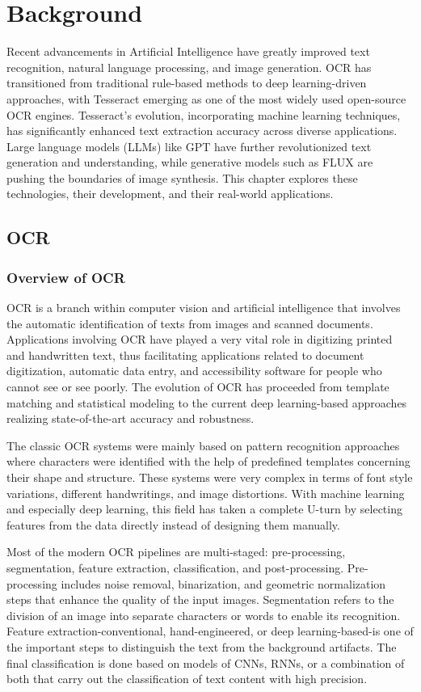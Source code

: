 \chapter{Background}

Recent advancements in Artificial Intelligence have greatly improved text recognition, natural language processing, and image generation. OCR has transitioned from traditional rule-based methods to deep learning-driven approaches, with Tesseract emerging as one of the most widely used open-source OCR engines. Tesseract’s evolution, incorporating machine learning techniques, has significantly enhanced text extraction accuracy across diverse applications. Large language models (LLMs) like GPT have further revolutionized text generation and understanding, while generative models such as FLUX are pushing the boundaries of image synthesis. This chapter explores these technologies, their development, and their real-world applications.


\section{OCR}
\subsection{Overview of OCR}
OCR is a branch within computer vision and artificial intelligence that involves the automatic identification of texts from images and scanned documents. Applications involving OCR have played a very vital role in digitizing printed and handwritten text, thus facilitating applications related to document digitization, automatic data entry, and accessibility software for people who cannot see or see poorly. The evolution of OCR has proceeded from template matching and statistical modeling to the current deep learning-based approaches realizing state-of-the-art accuracy and robustness.

The classic OCR systems were mainly based on pattern recognition approaches where characters were identified with the help of predefined templates concerning their shape and structure. These systems were very complex in terms of font style variations, different handwritings, and image distortions. With machine learning and especially deep learning, this field has taken a complete U-turn by selecting features from the data directly instead of designing them manually.

Most of the modern OCR pipelines are multi-staged: pre-processing, segmentation, feature extraction, classification, and post-processing. Pre-processing includes noise removal, binarization, and geometric normalization steps that enhance the quality of the input images. Segmentation refers to the division of an image into separate characters or words to enable its recognition. Feature extraction-conventional, hand-engineered, or deep learning-based-is one of the important steps to distinguish the text from the background artifacts. The final classification is done based on models of CNNs, RNNs, or a combination of both that carry out the classification of text content with high precision.

